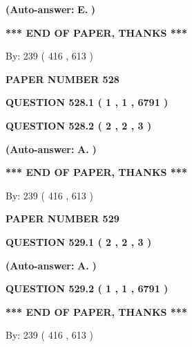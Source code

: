 \documentclass[12pt]{article}
\begin{document}
 
{\textbf{(Auto-answer:}}
{\textbf{\large{
E.}}}
{\textbf{)}}
 
 
   
   
   
   
\vspace{1.0in} 
{\textbf{\large{ *** END OF PAPER, THANKS *** }}} 
   
   
\hspace{1.0in} By: 
 239 ( 416 ,  613 )
   
   
   
   
\newpage 
\setcounter{page}{ 
   528001 } 
   
   
 {\textbf{ \Large{ PAPER NUMBER  528  }}}
   
   
   
   
  
  
{\textbf{\large{QUESTION
528.1 
 ( 1 , 1 , 6791 )
}}}
  
  
{\textbf{\large{QUESTION
528.2 
 ( 2 , 2 , 3 )
}}}
 
 
{\textbf{(Auto-answer:}}
{\textbf{\large{
A.}}}
{\textbf{)}}
 
 
   
   
   
   
\vspace{1.0in} 
{\textbf{\large{ *** END OF PAPER, THANKS *** }}} 
   
   
\hspace{1.0in} By: 
 239 ( 416 ,  613 )
   
   
   
   
\newpage 
\setcounter{page}{ 
   529001 } 
   
   
 {\textbf{ \Large{ PAPER NUMBER  529  }}}
   
   
   
   
  
  
{\textbf{\large{QUESTION
529.1 
 ( 2 , 2 , 3 )
}}}
 
 
{\textbf{(Auto-answer:}}
{\textbf{\large{
A.}}}
{\textbf{)}}
 
 
  
  
{\textbf{\large{QUESTION
529.2 
 ( 1 , 1 , 6791 )
}}}
   
   
   
   
\vspace{1.0in} 
{\textbf{\large{ *** END OF PAPER, THANKS *** }}} 
   
   
\hspace{1.0in} By: 
 239 ( 416 ,  613 )
   
   
   
   
\newpage 
\setcounter{page}{ 
   530001 } 
   
\end{document}
